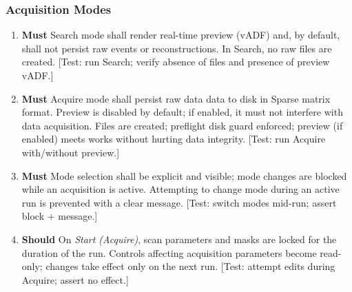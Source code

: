 \documentclass[10pt]{article}
\newcommand{\PriorityTag}[2]{%
  \colorbox{#2!25}{\footnotesize\textsf{\textbf{#1}}}\hspace{0.6em}}
\newcommand{\must}{\leavevmode\PriorityTag{Must}{green}}
\newcommand{\should}{\leavevmode\PriorityTag{Should}{yellow}}
\newcounter{reqgrp}[section] %
\newcounter{reqno}
\newcommand{\reqprefix}{GEN}
\newenvironment{requirements}[1]{%
  \renewcommand{\reqprefix}{#1}%
  \refstepcounter{reqgrp}%
  \setcounter{reqno}{0}%
  \begin{enumerate}[leftmargin=*]
}{\end{enumerate}}
\begin{document}
\subsubsection{Acquisition Modes}
\begin{requirements}{ACQ}

\item \must {}
  {Search mode shall render real-time preview (vADF) and, by default, shall not persist raw events or reconstructions.}
  {In Search, no raw files are created.}
  [Test: run Search; verify absence of files and presence of preview vADF.]

\item \must {}
  {Acquire mode shall persist raw data data to disk in Sparse matrix format. Preview is disabled by default; if enabled, it must not interfere with data acquisition.}
  {Files are created; preflight disk guard enforced; preview (if enabled) meets works without hurting data integrity.}
  [Test: run Acquire with/without preview.]

\item \must {}
  {Mode selection shall be explicit and visible; mode changes are blocked while an acquisition is active.}
  {Attempting to change mode during an active run is prevented with a clear message.}
  [Test: switch modes mid-run; assert block + message.]

\item \should {}
  {On \emph{Start (Acquire)}, scan parameters and masks are locked for the duration of the run.}
  {Controls affecting acquisition parameters become read-only; changes take effect only on the next run.}
  [Test: attempt edits during Acquire; assert no effect.]

\end{requirements}
\end{document}
